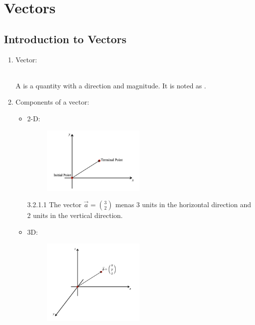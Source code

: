 \documentclass[12pt, a4paper]{article}
\begin{document}
\newpage
\section{Vectors}
\subsection{Introduction to Vectors}
\begin{enumerate}
  \item Vector: 
  \begin{myclaim}{ }{}
    \\A \textbf{\color{red}{vector}} is a quantity with a direction and magnitude. It is noted as {}.
  \end{myclaim}
  \item Components of a vector: 
  \begin{itemize}
    \item 2-D: 
    \begin{figure}[H]
      \centering
      \includegraphics[width=0.5\textwidth]{Fig.3.1.jpg}
    \end{figure}
    \begin{example}{3.2.1.1}{}
      The vector $\vec{a}=\binom{3}{2}$ menas 3 units in the horizontal direction and 2 units in the vertical direction.
    \end{example}
    \item 3D: 
    \begin{figure}[H]
      \centering
      \includegraphics[width=0.5\textwidth]{Fig.3.2.jpg}

\end{figure}
\end{itemize}
\end{enumerate}
\end{document}
